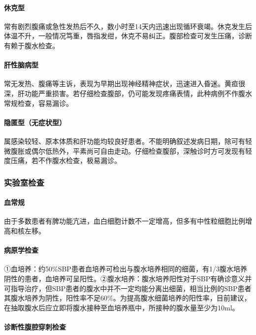 \paragraph{休克型}

常有剧烈腹痛或急性发热后不久，数小时至14天内迅速出现循环衰竭。休克发生后体温不升，一般情况笃重，唇指发绀，休克不易纠正。腹部检查可发生压痛，诊断有赖于腹水检查。

\paragraph{肝性脑病型}

常无发热、腹痛等主诉，表现为早期出现神经精神症状，迅速进入昏迷。黄疸很深，肝功能严重损害。若仔细检查腹部，仍可能发现疼痛表情，此种病例不作腹水常规检查，容易漏诊。

\paragraph{隐匿型（无症状型）}

属感染较轻、原本体质和肝功能均较良好患者。不能明确叙述发病日期，除可有轻微腹胀或偶尔低热外，平素尚可自由走动。仔细检查腹部，深触诊时方可发现有轻度压痛，若不作腹水检查，极易漏诊。

\subsubsection{实验室检查}

\paragraph{血常规}

由于多数患者有脾功能亢进，血白细胞计数不一定增高，但多有中性粒细胞比例增高和核左移。

\paragraph{病原学检查}

①血培养：约50\%SBP患者血培养可检出与腹水培养相同的细菌，有1/3腹水培养阴性的患者，血培养可呈阳性。②腹水培养：腹水培养阳性对于SBP有确诊意义并可指导治疗，但SBP患者的腹水中并不一定均能分离出细菌，相当比例的SBP患者其腹水培养为阴性，阳性率不足60\%。为提高腹水细菌培养的阳性率，目前建议，在抽取腹水后应立即将腹水接种至血培养瓶中，所接种的腹水量至少为10ml。

\paragraph{诊断性腹腔穿刺检查}


